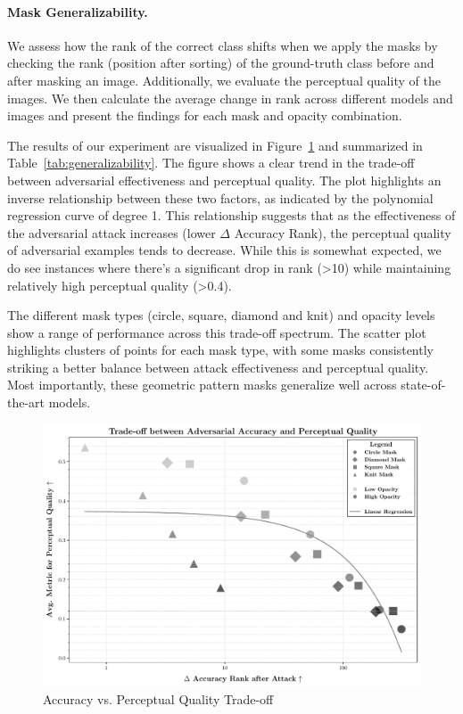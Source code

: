 \documentclass[a4paper, oneside]{discothesis}
\begin{document}
\paragraph{Mask Generalizability.}

We assess how the rank of the correct class shifts when we apply the masks by checking the rank (position after sorting) of the ground-truth class before and after masking an image. Additionally, we evaluate the perceptual quality of the images. We then calculate the average change in rank across different models and images and present the findings for each mask and opacity combination. 

The results of our experiment are visualized in Figure~\ref{fig:accpercept} and summarized in Table~\ref{tab:generalizability}. The figure shows a clear trend in the trade-off between adversarial effectiveness and perceptual quality. The plot highlights an inverse relationship between these two factors, as indicated by the polynomial regression curve of degree 1. This relationship suggests that as the effectiveness of the adversarial attack increases (lower $\Delta$ Accuracy Rank), the perceptual quality of adversarial examples tends to decrease. While this is somewhat expected, we do see instances where there's a significant drop in rank (>10) while maintaining relatively high perceptual quality (>0.4).

The different mask types (circle, square, diamond and knit) and opacity levels show a range of performance across this trade-off spectrum. The scatter plot highlights clusters of points for each mask type, with some masks consistently striking a better balance between attack effectiveness and perceptual quality. Most importantly, these geometric pattern masks generalize well across state-of-the-art models.

\begin{figure}
	\centering
	\includegraphics[width=1\columnwidth]{figures/eval_cls_generalizability.pdf}
	\caption{Accuracy vs. Perceptual Quality Trade-off}
	\label{fig:accpercept}
\end{figure}
\end{document}
